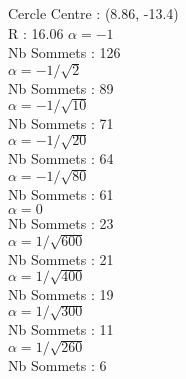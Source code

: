 \documentclass{beamer}
\begin{document}
\begin{frame}
\begin{columns}[t]
\begin{column}{4cm}
\begin{exampleblock}{Cercle}
      {
        Centre : (8.86, -13.4)\\
        R : 16.06
      }
      {
        $\alpha = -1$\\
         Nb Sommets : 126\\
      }
      {
        $\alpha = -1/\sqrt{2}$\\
        Nb Sommets : 89\\
      }
      {
        $\alpha = -1/\sqrt{10}$\\
         Nb Sommets : 71\\
      }
      {
        $\alpha = -1/\sqrt{20}$\\
         Nb Sommets : 64\\
      }
      {
        $\alpha = -1/\sqrt{80}$\\
         Nb Sommets : 61\\
      }
      {
        $\alpha = 0$\\
         Nb Sommets : 23\\
      }
      {
        $\alpha = 1/\sqrt{600}$\\
         Nb Sommets : 21\\
      }
      {
        $\alpha = 1/\sqrt{400}$\\
         Nb Sommets : 19\\
      }
      {
        $\alpha = 1/\sqrt{300}$\\
         Nb Sommets : 11\\
      }
      {
        $\alpha = 1/\sqrt{260}$\\
         Nb Sommets : 6\\
      }
    \end{exampleblock}

    
  \end{column}


\end{columns}
\end{frame}
\end{document}
